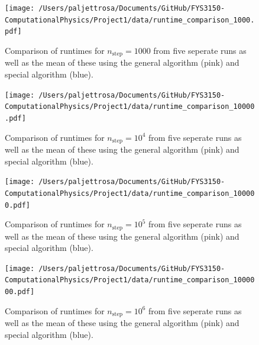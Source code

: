 \documentclass[english,notitlepage]{revtex4-1}  %
\begin{document}
\begin{figure}[h!]
    \centering 
    \texttt{[image: /Users/paljettrosa/Documents/GitHub/FYS3150-ComputationalPhysics/Project1/data/runtime\_comparison\_1000.pdf]} %
    \caption{Comparison of runtimes for $n_\text{step} = 1000$ from five seperate runs as well as the mean of these using the general algorithm (pink) and special algorithm (blue).}
    \label{timing 3}
\end{figure}

\begin{figure}[h!]
    \centering 
    \texttt{[image: /Users/paljettrosa/Documents/GitHub/FYS3150-ComputationalPhysics/Project1/data/runtime\_comparison\_10000.pdf]} %
    \caption{Comparison of runtimes for $n_\text{step} = 10^4$ from five seperate runs as well as the mean of these using the general algorithm (pink) and special algorithm (blue).}
    \label{timing 4}
\end{figure}

\begin{figure}[h!]
    \centering 
    \texttt{[image: /Users/paljettrosa/Documents/GitHub/FYS3150-ComputationalPhysics/Project1/data/runtime\_comparison\_100000.pdf]} %
    \caption{Comparison of runtimes for $n_\text{step} = 10^5$ from five seperate runs as well as the mean of these using the general algorithm (pink) and special algorithm (blue).}
    \label{timing 5}
\end{figure}

\begin{figure}[h!]
    \centering 
    \texttt{[image: /Users/paljettrosa/Documents/GitHub/FYS3150-ComputationalPhysics/Project1/data/runtime\_comparison\_1000000.pdf]} %
    \caption{Comparison of runtimes for $n_\text{step} = 10^6$ from five seperate runs as well as the mean of these using the general algorithm (pink) and special algorithm (blue).}
    \label{timing 6}
\end{figure}

   
\end{document}
